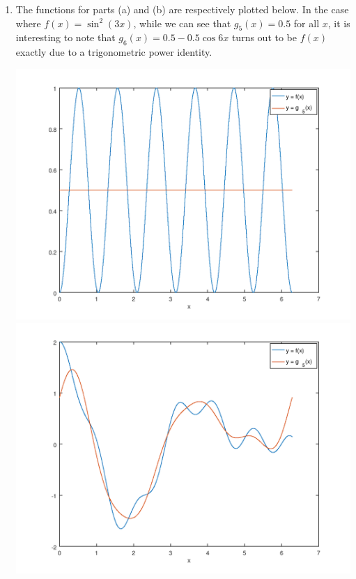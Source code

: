 \documentclass[a4paper,12pt]{article}
\begin{document}
\begin{enumerate}
    \item
        The functions for parts (a) and (b) are respectively plotted below. In the case where $f(x) = \sin^2(3x)$, while we can see that $g_5(x) = 0.5$ for all $x$, it is interesting to note that $g_6(x) = 0.5 - 0.5\cos 6x$ turns out to be $f(x)$ exactly due to a trigonometric power identity. \par
        \includegraphics[scale=0.25]{hw3_5a}
        \includegraphics[scale=0.25]{hw3_5b}


\end{enumerate}
\end{document}
